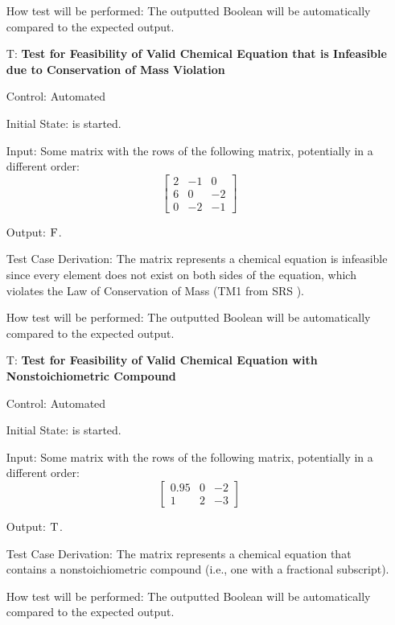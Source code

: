 \documentclass[12pt, titlepage]{article}
\newcounter{testnum} %
\begin{document}
\begin{enumerate}
    How test will be performed: The outputted Boolean will be automatically
    compared to the expected output.

  \item[T\refstepcounter{testnum}\thetestnum \label{test_cons_mass_valid_inf}:]
    \textbf{Test for Feasibility of  Valid Chemical Equation that is Infeasible
      due to Conservation of Mass Violation}

    Control: Automated

    Initial State: \progname{} is started.

    Input: Some matrix with the rows of the following matrix, potentially in a
    different order:
    $$\begin{bmatrix}
        2 & -1 & 0  \\
        6 & 0  & -2 \\
        0 & -2 & -1
      \end{bmatrix}$$

    Output: $\textsc{F}$.

    Test Case Derivation: The matrix represents a chemical equation is
    infeasible since
    every element does not exist on both sides of the equation, which violates
    the Law of Conservation of Mass (TM1 from SRS ).

    How test will be performed: The outputted Boolean will be automatically
    compared to the expected output.

  \item[T\refstepcounter{testnum}\thetestnum \label{test_nonstoich_valid_feas}:]
    \textbf{Test for Feasibility of Valid Chemical Equation with
      Nonstoichiometric Compound}

    Control: Automated

    Initial State: \progname{} is started.

    Input: Some matrix with the rows of the following matrix, potentially in a
    different order:
    $$\begin{bmatrix}
        0.95 & 0 & -2 \\
        1    & 2 & -3
      \end{bmatrix}$$

    Output: $\textsc{T}$.

    Test Case Derivation: The matrix represents a chemical equation that
    contains a nonstoichiometric compound (i.e., one with a fractional
    subscript).

    How test will be performed: The outputted Boolean will be automatically
    compared to the expected output.

\end{enumerate}
\end{document}
